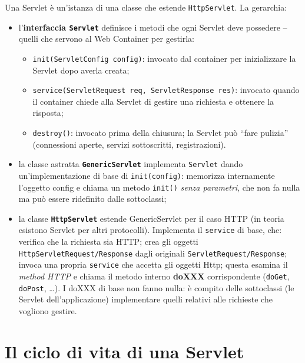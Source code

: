 Una Servlet \`e un'istanza di una classe che estende \texttt{HttpServlet}. La gerarchia:
\begin{itemize}
  \item l'\textbf{interfaccia \texttt{Servlet}} definisce i metodi che ogni Servlet deve
        possedere -- quelli che servono al Web Container per gestirla:
        \begin{itemize}
          \item \texttt{init(ServletConfig config)}: invocato dal container per
                inizializzare la Servlet dopo averla creata;
          \item \texttt{service(ServletRequest req, ServletResponse res)}: invocato quando il
                container chiede alla Servlet di gestire una richiesta e ottenere la
                risposta;
          \item \texttt{destroy()}: invocato prima della chiusura; la Servlet pu\`o ``fare
                pulizia'' (connessioni aperte, servizi sottoscritti, registrazioni).
        \end{itemize}
  \item la classe astratta \textbf{\texttt{GenericServlet}} implementa \texttt{Servlet} dando
        un'implementazione di base di \texttt{init(config)}: memorizza internamente
        l'oggetto config e chiama un metodo \texttt{init()} \emph{senza parametri}, che non
        fa nulla ma pu\`o essere ridefinito dalle sottoclassi;
  \item la classe \textbf{\texttt{HttpServlet}} estende GenericServlet per il caso HTTP
        (in teoria esistono Servlet per altri protocolli). Implementa il \texttt{service} di
        base, che: verifica che la richiesta sia HTTP; crea gli oggetti
        \texttt{HttpServletRequest/Response} dagli originali
        \texttt{ServletRequest/Response}; invoca una propria \texttt{service} che accetta gli
        oggetti Http; questa esamina il \emph{method HTTP} e chiama il metodo interno
        \textbf{doXXX} corrispondente (\texttt{doGet}, \texttt{doPost}, \dots). I doXXX di
        base non fanno nulla: \`e compito delle sottoclassi (le Servlet dell'applicazione)
        implementare quelli relativi alle richieste che vogliono gestire.
\end{itemize}

\section{Il ciclo di vita di una Servlet}

